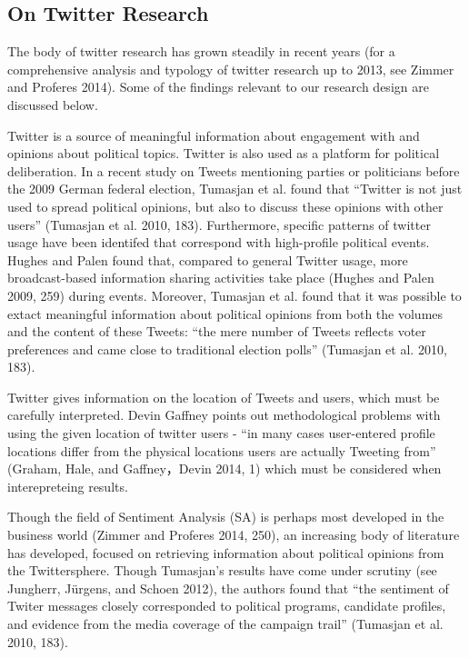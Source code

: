 \documentclass[]{article}
\begin{document}
\subsection{On Twitter Research}\label{on-twitter-research}

The body of twitter research has grown steadily in recent years (for a
comprehensive analysis and typology of twitter research up to 2013, see
Zimmer and Proferes 2014). Some of the findings relevant to our research
design are discussed below.

Twitter is a source of meaningful information about engagement with and
opinions about political topics. Twitter is also used as a platform for
political deliberation. In a recent study on Tweets mentioning parties
or politicians before the 2009 German federal election, Tumasjan et al.
found that ``Twitter is not just used to spread political opinions, but
also to discuss these opinions with other users'' (Tumasjan et al. 2010,
183). Furthermore, specific patterns of twitter usage have been
identifed that correspond with high-profile political events. Hughes and
Palen found that, compared to general Twitter usage, more
broadcast-based information sharing activities take place (Hughes and
Palen 2009, 259) during events. Moreover, Tumasjan et al. found that it
was possible to extact meaningful information about political opinions
from both the volumes and the content of these Tweets: ``the mere number
of Tweets reflects voter preferences and came close to traditional
election polls'' (Tumasjan et al. 2010, 183).

Twitter gives information on the location of Tweets and users, which
must be carefully interpreted. Devin Gaffney points out methodological
problems with using the given location of twitter users - ``in many
cases user-entered profile locations differ from the physical locations
users are actually Tweeting from'' (Graham, Hale, and Gaffney，Devin
2014, 1) which must be considered when interepreteing results.

Though the field of Sentiment Analysis (SA) is perhaps most developed in
the business world (Zimmer and Proferes 2014, 250), an increasing body
of literature has developed, focused on retrieving information about
political opinions from the Twittersphere. Though Tumasjan's results
have come under scrutiny (see Jungherr, J{ü}rgens, and Schoen 2012), the
authors found that ``the sentiment of Twiter messages closely
corresponded to political programs, candidate profiles, and evidence
from the media coverage of the campaign trail'' (Tumasjan et al. 2010,
183).
\end{document}
